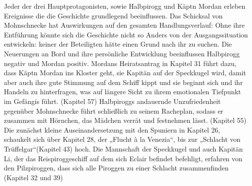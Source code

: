 Jeder der drei Hauptprotagonisten, sowie Halbpirogg und Käptn Mordan erleben Ereignisse die die Geschichte grundlegend beeinflussen. Das Schicksal von Mohnschnecke hat Auswirkungen auf den gesamten Handlungsverlauf: Ohne ihre Entführung könnte sich die Geschichte nicht so Anders von der Ausgangssituation entwickeln: keiner der Beteiligten hätte einen Grund nach ihr zu suchen. Die Neuerungen an Bord und ihre persönliche Entwicklung beeinflussen Halbpirogg negativ und Mordan positiv. Mordans Heiratsantrag in Kapitel 31 führt dazu, dass Käptn Mordan ins Kloster geht, sie Kapitän auf der Speckkugel wird, damit aber auch ihre gute Stimmung auf dem Schiff kippt und sie beginnt sich und ihr Handeln zu hinterfragen, was auf längere Sicht zu ihrem emotionalen Tiefpunkt im Gefängis führt. (Kapitel 57) Halbpiroggs andauernde Unzufriedenheit gegenüber Mohnschnecke führt schließlich zu seinem Racheplan, sodass er zusammen mit Hörnchen, das Mädchen verrät und festnehmen lässt. (Kapitel 55) Die zunächst kleine Auseinandersetzung mit den Spuniern in Kapitel 26, schaukelt sich über Kapitel 28, der „Flucht à la Venezia“, bis zur „Schlacht von Trüffelgar“(Kapitel 43) hoch. Die Mannschaft der Speckkugel und auch Kapitän Li, der  das Reispiroggeschiff auf dem sich Eclair befindet befehligt, erfahren von den Pilzpiroggen, dass sich alle Piroggen zu einer Schlacht zusammenfinden (Kapitel 32 und 39)
